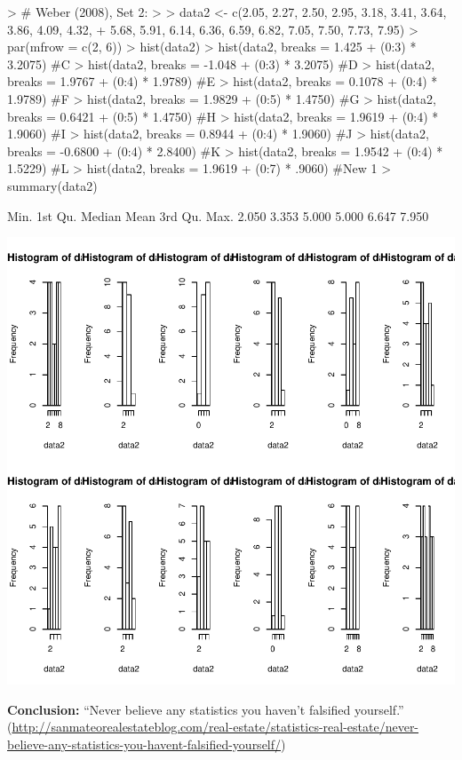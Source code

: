\begin{Schunk}
\begin{Sinput}
> # Weber (2008), Set 2:
> 
> data2 <- c(2.05, 2.27, 2.50, 2.95, 3.18, 3.41, 3.64, 3.86, 4.09, 4.32,
+   5.68, 5.91, 6.14, 6.36, 6.59, 6.82, 7.05, 7.50, 7.73, 7.95)
> par(mfrow = c(2, 6))
> hist(data2)
> hist(data2, breaks = 1.425 + (0:3) * 3.2075) #C
> hist(data2, breaks = -1.048 + (0:3) * 3.2075) #D
> hist(data2, breaks = 1.9767 + (0:4) * 1.9789) #E
> hist(data2, breaks = 0.1078 + (0:4) * 1.9789) #F
> hist(data2, breaks = 1.9829 + (0:5) * 1.4750) #G
> hist(data2, breaks = 0.6421 + (0:5) * 1.4750) #H
> hist(data2, breaks = 1.9619 + (0:4) * 1.9060) #I
> hist(data2, breaks = 0.8944 + (0:4) * 1.9060) #J
> hist(data2, breaks = -0.6800 + (0:4) * 2.8400) #K
> hist(data2, breaks = 1.9542 + (0:4) * 1.5229) #L
> hist(data2, breaks = 1.9619 + (0:7) * .9060) #New 1
> summary(data2)
\end{Sinput}
\begin{Soutput}
   Min. 1st Qu.  Median    Mean 3rd Qu.    Max. 
  2.050   3.353   5.000   5.000   6.647   7.950 
\end{Soutput}
\end{Schunk}
\includegraphics{lect_chapter5_v2-003}

{\bf Conclusion:} ``Never believe any statistics you haven't falsified yourself.'' \\
{\tiny
(\url{http://sanmateorealestateblog.com/real-estate/statistics-real-estate/never-believe-any-statistics-you-havent-falsified-yourself/})
}


